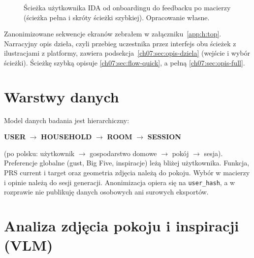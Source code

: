 \begin{figure}[htbp]
  \centering
  \caption{Ścieżka użytkownika IDA od onboardingu do feedbacku po macierzy (ścieżka pełna i skróty ścieżki szybkiej). Opracowanie własne.}
  \label{fig:ch07:flow}
\end{figure}

Zanonimizowane sekwencje ekranów zebrałem w załączniku~\ref{app:h:top}. Narracyjny opis dzieła, czyli przebieg uczestnika przez interfejs obu ścieżek z ilustracjami z platformy, zawiera podsekcja~\ref{ch07:sec:opis-dziela} (wejście i wybór ścieżki). Ścieżkę szybką opisuje \ref{ch07:sec:flow-quick}, a pełną \ref{ch07:sec:opis-full}.



\section{Warstwy danych}
\label{ch07:sec:warstwy}

Model danych badania jest hierarchiczny:

\begin{center}
\textbf{USER} $\rightarrow$ \textbf{HOUSEHOLD} $\rightarrow$ \textbf{ROOM} $\rightarrow$ \textbf{SESSION}
\end{center}

\noindent
(po polsku: użytkownik $\rightarrow$ gospodarstwo domowe $\rightarrow$ pokój $\rightarrow$ sesja). Preferencje globalne (gust, Big Five, inspiracje) leżą bliżej użytkownika. Funkcja, PRS current i target oraz geometria zdjęcia należą do pokoju. Wybór w macierzy i opinie należą do sesji generacji. Anonimizacja opiera się na \texttt{user\_hash}, a w rozprawie nie publikuję danych osobowych ani surowych eksportów.

\section{Analiza zdjęcia pokoju i inspiracji (VLM)}
\label{ch07:sec:vlm}

